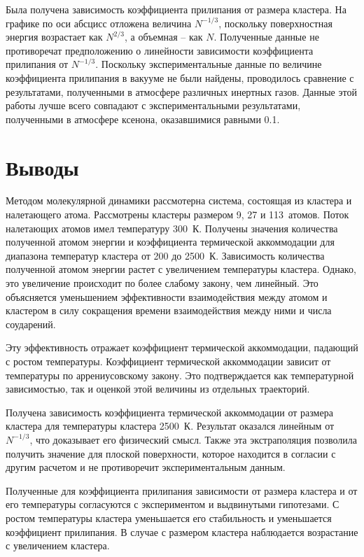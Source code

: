 Была получена зависимость коэффициента прилипания от размера кластера. На графике по оси абсцисс отложена величина $N^{-1/3}$, поскольку поверхностная энергия возрастает как $N^{2/3}$, а объемная \--- как $N$. Полученные данные не противоречат предположению о линейности зависимости коэффициента прилипания от $N^{-1/3}$. Поскольку экспериментальные данные по величине коэффициента прилипания в вакууме не были найдены, проводилось сравнение с результатами, полученными в атмосфере различных инертных газов. Данные этой работы лучше всего совпадают с экспериментальными результатами, полученными в атмосфере ксенона, оказавшимися равными 0.1. 

\section{Выводы}

Методом молекулярной динамики рассмотерна система, состоящая из кластера и налетающего атома. Рассмотрены кластеры размером 9, 27 и 113~атомов. Поток налетающих атомов имел температуру 300~К. Получены значения количества полученной атомом энергии и коэффициента термической аккоммодации для диапазона температур кластера от 200 до 2500~К. Зависимость количества полученной атомом энергии растет с увеличением температуры кластера. Однако, это увеличение происходит по более слабому закону, чем линейный. Это объясняется уменьшением эффективности взаимодействия между атомом и кластером в силу сокращения времени взаимодействия между ними и числа соударений. 

Эту эффективность отражает коэффициент термической аккоммодации, падающий с ростом температуры. Коэффициент термической аккоммодации зависит от температуры по аррениусовскому закону. Это подтверждается как температурной зависимостью, так и оценкой этой величины из отдельных траекторий. 

Получена зависимость коэффициента термической аккоммодации от размера кластера для температуры кластера 2500~К. Результат оказался линейным от $N^{-1/3}$, что доказывает его физический смысл. Также эта экстраполяция позволила получить значение для плоской поверхности, которое находится в согласии с другим расчетом и не противоречит экспериментальным данным.

Полученные для коэффициента прилипания зависимости от размера кластера и от его температуры согласуются с экспериментом и выдвинутыми гипотезами. С ростом температуры кластера уменьшается его стабильность и уменьшается коэффициент прилипания. В случае с размером кластера наблюдается возрастание с увеличением кластера.